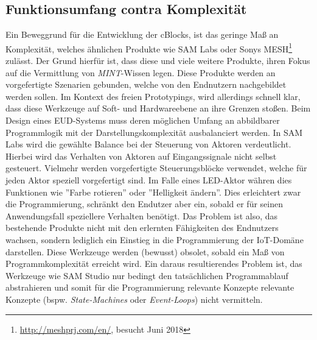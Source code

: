 \subsection{Funktionsumfang contra Komplexität}
Ein Beweggrund für die Entwicklung der cBlocks, ist das geringe Maß an Komplexität, welches ähnlichen Produkte wie SAM Labs oder Sonys MESH\footnote{\url{http://meshprj.com/en/}, besucht Juni 2018} zulässt. Der Grund hierfür ist, dass diese und viele weitere Produkte, ihren Fokus auf die Vermittlung von \textit{MINT}-Wissen legen. Diese Produkte werden an vorgefertigte Szenarien gebunden, welche von den Endnutzern nachgebildet werden sollen. Im Kontext des freien Prototypings, wird allerdings schnell klar, dass diese Werkzeuge auf Soft- und Hardwareebene an ihre Grenzen stoßen. Beim Design eines \ac{EUD}-Systems muss deren möglichen Umfang an abbildbarer Programmlogik mit der Darstellungskomplexität ausbalanciert werden. In SAM Labs wird die gewählte Balance bei der Steuerung von Aktoren verdeutlicht. Hierbei wird das Verhalten von Aktoren auf Eingangssignale nicht selbst gesteuert. Vielmehr werden vorgefertigte Steuerungsblöcke verwendet, welche für jeden Aktor speziell vorgefertigt sind. Im Falle eines LED-Aktor währen dies Funktionen wie ''Farbe rotieren'' oder ''Helligkeit ändern''. Dies erleichtert zwar die Programmierung, schränkt den Endutzer aber ein, sobald er für seinen Anwendungsfall speziellere Verhalten benötigt. Das Problem ist also, das bestehende Produkte nicht mit den erlernten Fähigkeiten des Endnutzers wachsen, sondern lediglich ein Einstieg in die Programmierung der \ac{IoT}-Domäne darstellen. Diese Werkzeuge werden (bewusst) obsolet, sobald ein Maß von Programmkomplexität erreicht wird. Ein daraus resultierendes Problem ist, das Werkzeuge wie SAM Studio nur bedingt den tatsächlichen Programmablauf abstrahieren und somit für die Programmierung relevante Konzepte relevante Konzepte (bspw. \textit{State-Machines} oder \textit{Event-Loops}) nicht vermitteln.


